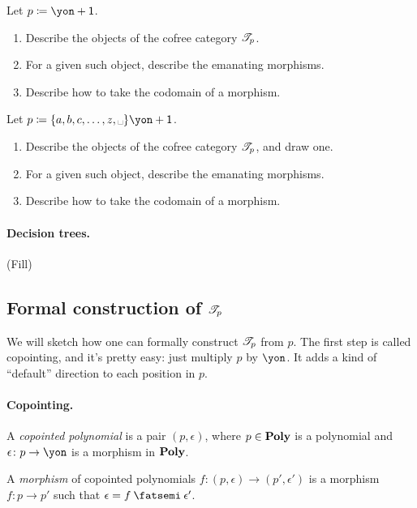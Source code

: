 \documentclass[DynamicalBook]{subfiles}
\begin{document}
\begin{exercise}
Let $p\coloneqq \yon+\1$.
\begin{enumerate}
	\item Describe the objects of the cofree category $\mathscr{T}_{p}$.
	\item For a given such object, describe the emanating morphisms.
	\item Describe how to take the codomain of a morphism.
\qedhere
\end{enumerate}
\end{exercise}

\begin{exercise}
Let $p\coloneqq \{a,b,c,\ldots,z,\text{\textvisiblespace}\}\yon+\1$.
\begin{enumerate}
	\item Describe the objects of the cofree category $\mathscr{T}_{p}$, and draw one.
	\item For a given such object, describe the emanating morphisms.
	\item Describe how to take the codomain of a morphism.
\qedhere
\end{enumerate}
\end{exercise}

\paragraph{Decision trees.}

(Fill)

\subsection{Formal construction of $\mathscr{T}_{p}$}

We will sketch how one can formally construct $\mathscr{T}_{p}$ from $p$. The first step is called copointing, and it's pretty easy: just multiply $p$ by $\yon$. It adds a kind of ``default'' direction to each position in $p$.

\paragraph{Copointing.}

\begin{definition}
A \emph{copointed polynomial} is a pair $(p,\epsilon)$, where $p\in\textbf{Poly}$ is a polynomial and $\epsilon\colon p\to\yon$ is a morphism in $\textbf{Poly}$.

A \emph{morphism} of copointed polynomials $f\colon (p,\epsilon)\to(p',\epsilon')$ is a morphism $f\colon p\to p'$ such that $\epsilon=f\then\epsilon'$.
\end{definition}
\end{document}
